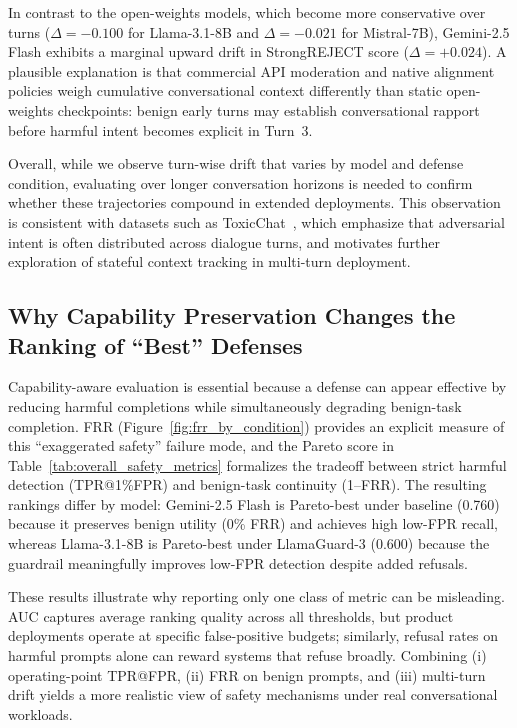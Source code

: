 \documentclass[10pt, twocolumn]{article}
\begin{document}
In contrast to the open-weights models, which become more conservative over turns ($\Delta = -0.100$ for Llama-3.1-8B and $\Delta = -0.021$ for Mistral-7B), Gemini-2.5 Flash exhibits a marginal upward drift in StrongREJECT score ($\Delta = +0.024$). A plausible explanation is that commercial API moderation and native alignment policies weigh cumulative conversational context differently than static open-weights checkpoints: benign early turns may establish conversational rapport before harmful intent becomes explicit in Turn~3.

Overall, while we observe turn-wise drift that varies by model and defense condition, evaluating over longer conversation horizons is needed to confirm whether these trajectories compound in extended deployments. This observation is consistent with datasets such as ToxicChat~\citep{lin2023toxicchat}, which emphasize that adversarial intent is often distributed across dialogue turns, and motivates further exploration of stateful context tracking in multi-turn deployment.

\subsection{Why Capability Preservation Changes the Ranking of ``Best'' Defenses}

Capability-aware evaluation is essential because a defense can appear effective by reducing harmful completions while simultaneously degrading benign-task completion. FRR (Figure~\ref{fig:frr_by_condition}) provides an explicit measure of this ``exaggerated safety'' failure mode, and the Pareto score in Table~\ref{tab:overall_safety_metrics} formalizes the tradeoff between strict harmful detection (TPR@1\%FPR) and benign-task continuity (1--FRR). The resulting rankings differ by model: Gemini-2.5 Flash is Pareto-best under baseline (0.760) because it preserves benign utility (0\% FRR) and achieves high low-FPR recall, whereas Llama-3.1-8B is Pareto-best under LlamaGuard-3 (0.600) because the guardrail meaningfully improves low-FPR detection despite added refusals.

These results illustrate why reporting only one class of metric can be misleading. AUC captures average ranking quality across all thresholds, but product deployments operate at specific false-positive budgets; similarly, refusal rates on harmful prompts alone can reward systems that refuse broadly. Combining (i) operating-point TPR@FPR, (ii) FRR on benign prompts, and (iii) multi-turn drift yields a more realistic view of safety mechanisms under real conversational workloads.
\end{document}
